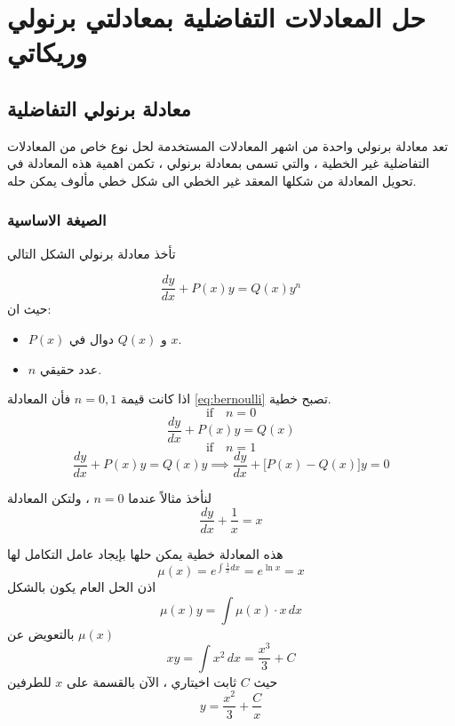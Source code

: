 \chapter{حل المعادلات التفاضلية بمعادلتي برنولي وريكاتي}

\section{معادلة برنولي التفاضلية }
تعد معادلة برنولي واحدة من اشهر المعادلات المستخدمة لحل نوع خاص من المعادلات التفاضلية غير الخطية ، والتي تسمى بمعادلة برنولي ، تكمن اهمية هذه المعادلة في تحويل المعادلة من شكلها المعقد غير الخطي الى شكل خطي مألوف يمكن حله.

\subsection*{الصيغة الاساسية}
تأخذ معادلة برنولي الشكل التالي

\begin{equation}
	\label{eq:bernoulli}
	\frac{dy}{dx} + P(x) y = Q(x) y^n
\end{equation}
حيث ان:
\begin{itemize}
	\item $P(x)$ و $Q(x)$ دوال في $x$.
	\item $n$ عدد حقيقي. 
\end{itemize}

\begin{note}
	اذا كانت قيمة $n=0,1 $ فأن المعادلة \eqref{eq:bernoulli} 
تصبح خطية.
\[
\text{if}\quad n=0 
\]
\[
\frac{dy}{dx} + P(x) y = Q(x)
\]
\[
\text{if}\quad n=1 
\]
\[
\frac{dy}{dx} + P(x) y = Q(x) y \implies \frac{dy}{dx} + \Big[P(x) - Q(x)\Big] y = 0
\]
\end{note}

\begin{example}
	لنأخذ مثالاً عندما $n=0 $ ، ولتكن المعادلة 
\[
\frac{dy}{dx} + \frac{1}{x} =x
\]
\end{example}
\begin{solution}
	هذه المعادلة خطية يمكن حلها بإيجاد عامل التكامل لها
	\[
	\mu(x) = e^{\int \frac{1}{x} dx} = e^{\ln x} = x
	\]
	اذن الحل العام يكون بالشكل
	\[
	\mu(x) y = \int \mu(x)\cdot x \, dx
	\]
	بالتعويض عن $\mu(x)$
	\[
	xy = \int x^2 \, dx = \frac{x^3}{3} + C
	\]
	حيث $C$ ثابت اخيتاري ، الآن بالقسمة على $x$ للطرفين
	\[
	y = \frac{x^2}{3} + \frac{C}{x}
	\]
\end{solution}

